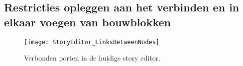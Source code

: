     







\subsection{Restricties opleggen aan het verbinden en in elkaar voegen van bouwblokken}

\begin{wrapfigure}{r}{0.2\textwidth}
    \centering    
    \texttt{[image: StoryEditor\_LinksBetweenNodes]}
    \caption{Verbonden porten in de huidige story editor.}
    \label{fig:linksinstoryeditor}
\end{wrapfigure}

